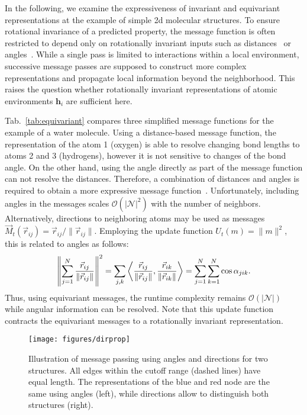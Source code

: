 \documentclass[reprint,
amsmath,amssymb,
 aip,jcp
]{revtex4-2}
\newcommand{\rr}{\vec{r}}
\begin{document}
In the following, we examine the expressiveness of invariant and equivariant representations at the example of simple 2d molecular structures.
To ensure rotational invariance of a predicted property, the message function is often restricted to depend only on rotationally invariant inputs such as distances~\cite{schutt2017deep,lubbers2018hierarchical} or angles~\cite{klicpera2020directional,klicpera2020fast}.
While a single pass is limited to interactions within a local environment, successive message passes are supposed to construct more complex representations and propagate local information beyond the neighborhood.
This raises the question whether rotationally invariant representations of atomic environments $\mathbf{h}_i$ are sufficient here.

Tab.~\ref{tab:equivariant} compares three simplified message functions for the example of a water molecule.
Using a distance-based message function, the representation of the atom 1 (oxygen) is able to resolve changing bond lengths to atoms 2 and 3 (hydrogens), however it is not sensitive to changes of the bond angle.
On the other hand, using the angle directly as part of the message function can not resolve the distances.
Therefore, a combination of distances and angles is required to obtain a more expressive message function~\cite{klicpera2020directional}.
Unfortunately, including angles in the messages scales $\mathcal{O}(|\mathcal{N}|^2)$ with the number of neighbors.
Alternatively, directions to neighboring atoms may be used as messages $\vec{M}_t(\rr_{ij}) = \rr_{ij} / \|\rr_{ij}\|$.
Employing the update function $U_t(m) = \| m \|^2$, this is related to angles as follows:
\begin{align}
     \left\| \sum_{j=1}^N \frac{\rr_{ij}}{\| \rr_{ij}\|} \right\|^2
     = \sum_{j, k} \left\langle \frac{\rr_{ij}}{\| \rr_{ij}\|}, \frac{\rr_{ik}}{\| \rr_{ik}\|} \right\rangle 
     = \sum_{j=1}^N \sum_{k=1}^N \cos{\alpha_{jik}}. \notag
\end{align}
Thus, using equivariant messages, the runtime complexity remains $\mathcal{O}(|\mathcal{N}|)$ while angular information can be resolved.
Note that this update function contracts the equivariant messages to a rotationally invariant representation.

\begin{figure}[tb]
    \centering
    \texttt{[image: figures/dirprop]}
    \caption{Illustration of message passing using angles and directions for two structures. All edges within the cutoff range (dashed lines) have equal length. The representations of the blue and red node are the same using angles (left), while directions allow to distinguish both structures (right). }
    \label{fig:dirprop}
\end{figure}
\end{document}
